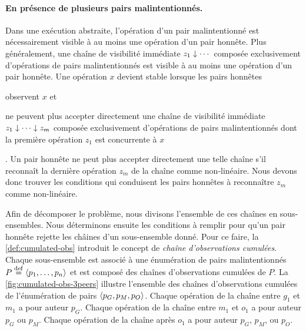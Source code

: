 \paragraph{En présence de plusieurs pairs malintentionnés.}
Dans une exécution abstraite, l'opération d'un pair malintentionné est nécessairement visible à au moins une opération d'un pair honnête.
Plus généralement, une chaîne de visibilité immédiate $z_1 \idr \dotsb$ composée exclusivement d'opérations de pairs malintentionnés est visible à au moins une opération d'un pair honnête.
Une opération $x$ devient stable lorsque les pairs honnêtes \begin{inlinelist}
    \item observent $x$ et
    \item ne peuvent plus accepter directement une chaîne de visibilité immédiate $z_1 \idr \dotsb \idr z_m$ composée exclusivement d'opérations de pairs malintentionnés dont la première opération $z_1$ est concurrente à $x$
\end{inlinelist}.
Un pair honnête ne peut plus accepter directement une telle chaîne s'il reconnaît la dernière opération $z_m$ de la chaîne comme non-linéaire.
Nous devons donc trouver les conditions qui conduisent les pairs honnêtes à reconnaître $z_m$ comme non-linéaire.

Afin de décomposer le problème, nous divisons l'ensemble de ces chaînes en sous-ensembles.
Nous déterminons ensuite les conditions à remplir pour qu'un pair honnête rejette les châines d'un sous-ensemble donné.
Pour ce faire, la \autoref{def:cumulated-obs} introduit le concept de \emph{chaîne d'observations cumulées}.
Chaque sous-ensemble est associé à une énumération de pairs malintentionnés $P \defeq \tuple*{p_1, \dotsc, p_n}$ et est composé des chaînes d'observations cumulées de $P$.
La \autoref{fig:cumulated-obs-3peers} illustre l'ensemble des chaînes d'observations cumulées de l'énumération de pairs $\tuple*{p_G, p_M, p_O}$.
Chaque opération de la chaîne entre $g_1$ et $m_1$ a pour auteur $p_G$.
Chaque opération de la chaîne entre $m_1$ et $o_1$ a pour auteur $p_G$ ou $p_M$.
Chaque opération de la chaîne après $o_1$ a pour auteur $p_G$, $p_M$, ou $p_O$.


